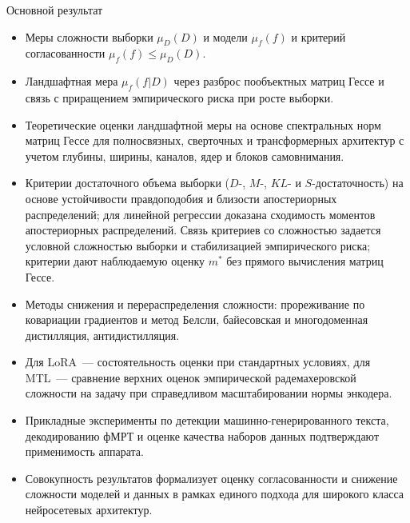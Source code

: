 \documentclass[10pt,pdf,hyperref={unicode}]{beamer}
\begin{document}
\begin{frame}{Основной результат}
\justifying
\footnotesize
\sloppy
\begin{itemize}
    \justifying
    \setlength{\itemsep}{-0.8pt}
    \item Меры сложности выборки $\mu_D(D)$ и модели $\mu_f(f)$ и критерий согласованности $\mu_f(f)\le\mu_D(D)$.
    \item Ландшафтная мера $\mu_f(f|D)$ через разброс пообъектных матриц Гессе и связь с приращением эмпирического риска при росте выборки.
    \item Теоретические оценки ландшафтной меры на основе спектральных норм матриц Гессе для полносвязных, сверточных и трансформерных архитектур с учетом глубины, ширины, каналов, ядер и блоков самовнимания.
    \item Критерии достаточного объема выборки ($D$-, $M$-, $KL$- и $S$-достаточность) на основе устойчивости правдоподобия и близости апостериорных распределений; для линейной регрессии доказана сходимость моментов апостериорных распределений. Связь критериев со сложностью задается условной сложностью выборки и стабилизацией эмпирического риска; критерии дают наблюдаемую оценку $m^*$ без прямого вычисления матриц Гессе.
    \item Методы снижения и перераспределения сложности: прореживание по ковариации градиентов и метод Белсли, байесовская и многодоменная дистилляция, антидистилляция.
    \item Для LoRA~--- состоятельность оценки при стандартных условиях, для MTL~--- сравнение верхних оценок эмпирической радемахеровской сложности на задачу при справедливом масштабировании нормы энкодера.
    \item Прикладные эксперименты по детекции машинно-генерированного текста, декодированию фМРТ и оценке качества наборов данных подтверждают применимость аппарата.
    \item Совокупность результатов формализует оценку согласованности и снижение сложности моделей и данных в рамках единого подхода для широкого класса нейросетевых архитектур.
\end{itemize}
\end{frame}
\end{document}
